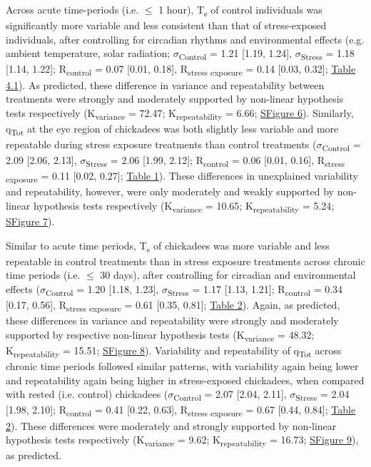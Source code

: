 \documentclass[12pt]{article}
\begin{document}
\noindent Across acute time-periods (i.e. $\leq$ 1 hour), T\textsubscript{s} of control individuals was significantly more variable and less consistent than that of stress-exposed individuals, after controlling for circadian rhythms and environmental effects (e.g. ambient temperature, solar radiation; $\sigma$\textsubscript{Control} = 1.21 [1.19, 1.24], $\sigma$\textsubscript{Stress} = 1.18 [1.14, 1.22]; R\textsubscript{control} = 0.07 [0.01, 0.18], R\textsubscript{stress exposure} = 0.14 [0.03, 0.32]; \hyperref[Tab4.1]{Table 4.1}). As predicted, these difference in variance and repeatability between treatments were strongly and moderately supported by non-linear hypothesis tests respectively (K\textsubscript{variance} = 72.47; K\textsubscript{repeatability} = 6.66; \hyperref[FigC.6]{SFigure 6}). Similarly, q\textsubscript{Tot} at the eye region of chickadees was both slightly less variable and more repeatable during stress exposure treatments than control treatments ($\sigma$\textsubscript{Control} = 2.09 [2.06, 2.13], $\sigma$\textsubscript{Stress} = 2.06 [1.99, 2.12]; R\textsubscript{control} = 0.06 [0.01, 0.16], R\textsubscript{stress exposure} = 0.11 [0.02, 0.27]; \hyperref[Tab4.1]{Table 1}). These differences in unexplained variability and repeatability, however, were only moderately and weakly supported by non-linear hypothesis tests respectively (K\textsubscript{variance} = 10.65; K\textsubscript{repeatability} = 5.24; \hyperref[FigC.7]{SFigure 7}). \vspace{1cm}
  
\noindent Similar to acute time periods, T\textsubscript{s} of chickadees was more variable and less repeatable in control treatments than in stress exposure treatments across chronic time periods (i.e. $\leq$ 30 days), after controlling for circadian and environmental effects ($\sigma$\textsubscript{Control} = 1.20 [1.18, 1.23], $\sigma$\textsubscript{Stress} = 1.17 [1.13, 1.21]; R\textsubscript{control} = 0.34 [0.17, 0.56], R\textsubscript{stress exposure} = 0.61 [0.35, 0.81]; \hyperref[Tab4.2]{Table 2}). Again, as predicted, these differences in variance and repeatability were strongly and moderately supported by respective non-linear hypothesis tests (K\textsubscript{variance} = 48.32; K\textsubscript{repeatability} = 15.51; \hyperref[FigC.8]{SFigure 8}). Variability and repeatability of q\textsubscript{Tot} across chronic time periods followed similar patterns, with variability again being lower and repeatability again being higher in stress-exposed chickadees, when compared with rested (i.e. control) chickadees ($\sigma$\textsubscript{Control} = 2.07 [2.04, 2.11], $\sigma$\textsubscript{Stress} = 2.04 [1.98, 2.10]; R\textsubscript{control} = 0.41 [0.22, 0.63], R\textsubscript{stress exposure} = 0.67 [0.44, 0.84]; \hyperref[Tab4.2]{Table 2}). These differences were moderately and strongly supported by non-linear hypothesis tests respectively (K\textsubscript{variance} = 9.62; K\textsubscript{repeatability} = 16.73; \hyperref[FigC.9]{SFigure 9}), as predicted.\vspace{0.5cm}
\end{document}
